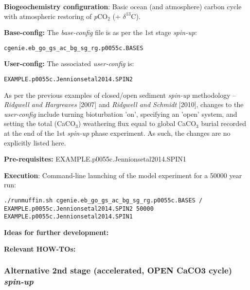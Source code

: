 \documentclass[10pt,twoside]{article}
\begin{document}
\noindent \textbf{Biogeochemistry configuration}: Basic ocean (and atmosphere) carbon cycle with atmospheric restoring of \textit{p}CO$_{2}$ (+ $\delta^{13}$C).

\noindent \textbf{Base-config:} The \textit{base-config} file is as per the 1st stage \textit{spin-up}:
\vspace{-10pt}\begin{verbatim}cgenie.eb_go_gs_ac_bg_sg_rg.p0055c.BASES\end{verbatim}\vspace{-10pt}

\noindent \textbf{User-config:} The associated \textit{user-config} is:
\vspace{-10pt}\begin{verbatim}EXAMPLE.p0055c.Jennionsetal2014.SPIN2\end{verbatim}\vspace{-10pt}
As per the previous examples of closed/open sediment \textit{spin-up} methodology -- \textit{Ridgwell and Hargreaves }[2007] and \textit{Ridgwell and Schmidt} [2010], changes to the \textit{user-config} include turning bioturbation 'on', specifying an 'open' system, and setting the total (CaCO$_{3}$) weathering flux equal to global CaCO$_{3}$ burial recorded at the end of the 1st \textit{spin-up} phase experiment. As such, the changes are no explicitly listed here.

\noindent \textbf{Pre-requisites:} EXAMPLE.p0055c.Jennionsetal2014.SPIN1

\noindent \textbf{Execution}: Command-line launching of the model experiment for a 50000 year run:
\vspace{-10pt}\small\begin{verbatim}
./runmuffin.sh cgenie.eb_go_gs_ac_bg_sg_rg.p0055c.BASES / 
EXAMPLE.p0055c.Jennionsetal2014.SPIN2 50000 
EXAMPLE.p0055c.Jennionsetal2014.SPIN1 
\end{verbatim}\normalsize\vspace{-10pt}

\noindent \textbf{Ideas for further development:} 

\noindent \textbf{Relevant HOW-TOs:} 


\subsubsection{Alternative 2nd stage (accelerated, OPEN CaCO3 cycle) \textit{spin-up}}\label{EXAMPLE.p0055c.Jennionsetal2014.SPIN2gl}
\end{document}
